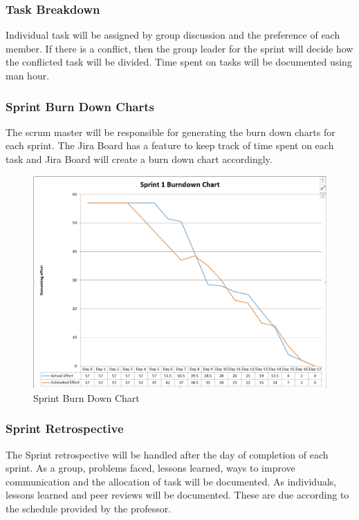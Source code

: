 \subsubsection{Task Breakdown}
Individual task will be assigned by group discussion and the preference of each member. If there is a conflict, then the group leader for the sprint will decide how the conflicted task will be divided. Time spent on tasks will be documented using man hour.

\subsubsection{Sprint Burn Down Charts}
The scrum master will be responsible for generating the burn down charts for each sprint. The Jira Board has a feature to keep track of time spent on each task and Jira Board will create a burn down chart accordingly.

\begin{figure}[h!]
    \centering
    \includegraphics[width=1\textwidth]{images/bigburn.jpg}
    \caption{Sprint Burn Down Chart}
\end{figure}

\subsubsection{Sprint Retrospective}
The Sprint retrospective will be handled after the day of completion of each sprint. As a group, problems faced, lessons learned, ways to improve communication and the allocation of task will be documented. As individuals, lessons learned and peer reviews will be documented. These are due according to the schedule provided by the professor.

